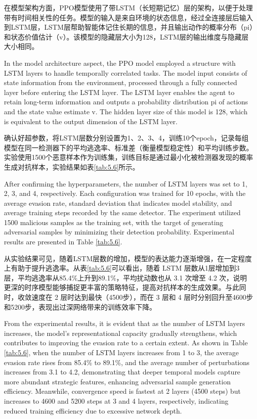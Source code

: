 在模型架构方面，PPO模型使用了带LSTM（长短期记忆）层的架构，以便于处理带有时间相关性的任务。模型的输入是来自环境的状态信息，经过全连接层后输入到LSTM层，LSTM层帮助智能体记住长期的信息，并且输出动作的概率分布（pi）和状态价值估计（v）。该模型的隐藏层大小为128，LSTM层的输出维度与隐藏层大小相同。

In the model architecture aspect, the PPO model employed a structure with LSTM layers to handle temporally correlated tasks. The model input consists of state information from the environment, processed through a fully connected layer before entering the LSTM layer. The LSTM layer enables the agent to retain long-term information and outputs a probability distribution pi of actions and the state value estimate v. The hidden layer size of this model is 128, which is equivalent to the output dimension of the LSTM layer.

确认好超参数，将LSTM层数分别设置为1、2、3、4，训练10个epoch，记录每组模型在同一检测器下的平均逃逸率、标准差（衡量模型稳定性）和平均训练步数。实验使用1500个恶意样本作为训练集，训练目标是通过最小化被检测器发现的概率生成对抗样本，实验结果如表\ref{tab:5.6}所示。

After confirming the hyperparameters, the number of LSTM layers was set to 1, 2, 3, and 4, respectively. Each configuration was trained for 10 epochs, with the average evasion rate, standard deviation that indicates model stability, and average training steps recorded by the same detector. The experiment utilized 1500 malicious samples as the training set, with the target of generating adversarial samples by minimizing their detection probability. Experimental results are presented in Table \ref{tab:5.6}.  

从实验结果可见，随着LSTM层数的增加，模型的表达能力逐渐增强，在一定程度上有助于提升逃逸率。从表\ref{tab:5.6}可以看出，随着 LSTM 层数从1层增加到3层，平均逃逸率从85.4\%上升到89.1\%，平均扰动数也从 3.1 次增至 4.2 次，说明更深的时序模型能够捕捉更丰富的策略特征，提高对抗样本的生成效果。与此同时，收敛速度在 2 层时达到最快（4500步），而在 3 层和 4 层时分别回升至4600步和5200步，表现出过深网络带来的训练效率下降。

From the experimental results, it is evident that as the number of LSTM layers increases, the model's representational capacity gradually strengthens, which contributes to improving the evasion rate to a certain extent. As shown in Table \ref{tab:5.6}, when the number of LSTM layers increases from 1 to 3, the average evasion rate rises from 85.4\% to 89.1\%, and the average number of perturbations increases from 3.1 to 4.2, demonstrating that deeper temporal models capture more abundant strategic features, enhancing adversarial sample generation efficiency. Meanwhile, convergence speed is fastest at 2 layers (4500 steps) but increases to 4600 and 5200 steps at 3 and 4 layers, respectively, indicating reduced training efficiency due to excessive network depth.

